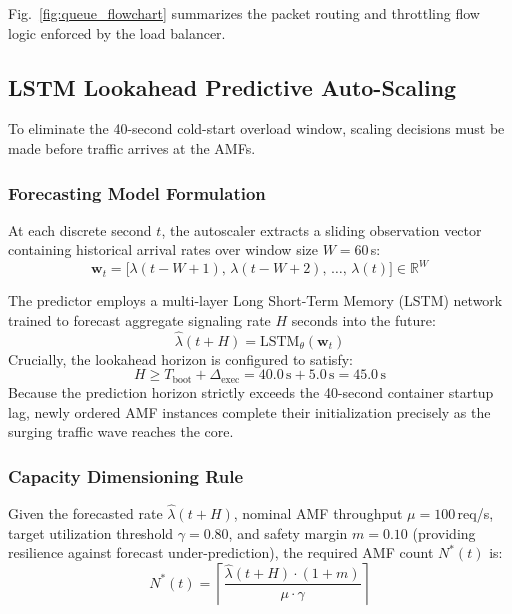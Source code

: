 \documentclass[conference]{IEEEtran}
\begin{document}
Fig.~\ref{fig:queue_flowchart} summarizes the packet routing and throttling flow logic enforced by the load balancer.

\subsection{LSTM Lookahead Predictive Auto-Scaling}
To eliminate the 40-second cold-start overload window, scaling decisions must be made before traffic arrives at the AMFs. 

\subsubsection{Forecasting Model Formulation}
At each discrete second $t$, the autoscaler extracts a sliding observation vector containing historical arrival rates over window size $W = 60$\,s:
\begin{equation}
\mathbf{w}_t = \big[\lambda(t - W + 1), \, \lambda(t - W + 2), \, \dots, \, \lambda(t)\big] \in \mathbb{R}^{W}
\end{equation}

The predictor employs a multi-layer Long Short-Term Memory (LSTM) network trained to forecast aggregate signaling rate $H$ seconds into the future:
\begin{equation}
\hat{\lambda}(t + H) = \text{LSTM}_{\theta}(\mathbf{w}_t)
\end{equation}
Crucially, the lookahead horizon is configured to satisfy:
\begin{equation}
H \ge T_{\text{boot}} + \Delta_{\text{exec}} = 40.0\,\text{s} + 5.0\,\text{s} = 45.0\,\text{s}
\end{equation}
Because the prediction horizon strictly exceeds the 40-second container startup lag, newly ordered AMF instances complete their initialization precisely as the surging traffic wave reaches the core.

\subsubsection{Capacity Dimensioning Rule}
Given the forecasted rate $\hat{\lambda}(t + H)$, nominal AMF throughput $\mu = 100$\,req/s, target utilization threshold $\gamma = 0.80$, and safety margin $m = 0.10$ (providing resilience against forecast under-prediction), the required AMF count $N^*(t)$ is:
\begin{equation}
N^*(t) = \left\lceil \frac{\hat{\lambda}(t + H) \cdot (1 + m)}{\mu \cdot \gamma} \right\rceil
\label{eq:scaling_rule}
\end{equation}
\end{document}
